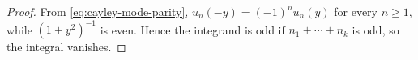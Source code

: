 \begin{proof}
From \eqref{eq:cayley-mode-parity}, $u_n(-y)=(-1)^n u_n(y)$ for every
$n\ge1$, while $(1+y^2)^{-1}$ is even.  Hence the integrand is odd if
$n_1+\cdots+n_k$ is odd, so the integral vanishes.
\end{proof}

\endinput
